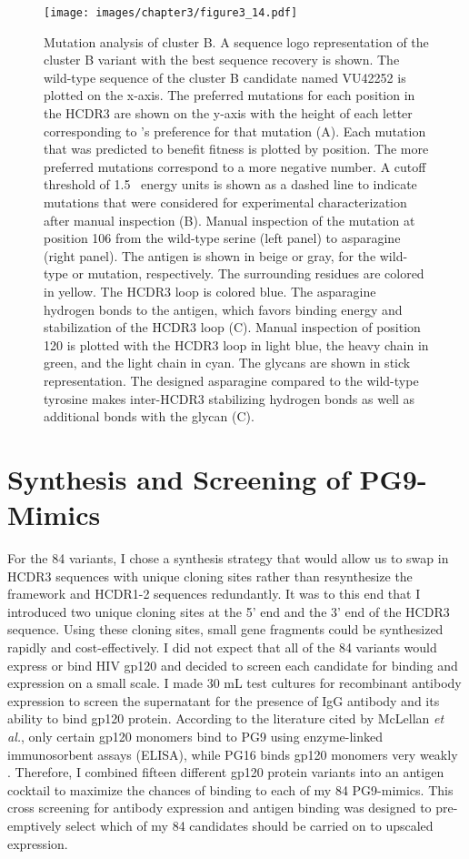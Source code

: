 \begin{figure}
   \centering
   \texttt{[image: images/chapter3/figure3\_14.pdf]} %
   \caption[Mutation Analysis of Cluster B]{Mutation analysis of cluster B. A sequence logo representation of the cluster B variant with the best sequence recovery is shown. The wild-type sequence of the cluster B candidate named VU42252 is plotted on the x-axis. The preferred mutations for each position in the HCDR3 are shown on the y-axis with the height of each letter corresponding to \rosetta's preference for that mutation (A). Each mutation that was predicted to benefit fitness is plotted by position. The more preferred mutations correspond to a more negative number. A cutoff threshold of 1.5 \rosetta~energy units is shown as a dashed line to indicate mutations that were considered for experimental characterization after manual inspection (B). Manual inspection of the mutation at position 106 from the wild-type serine (left panel) to asparagine (right panel). The antigen is shown in beige or gray, for the wild-type or mutation, respectively. The surrounding residues are colored in yellow. The HCDR3 loop is colored blue. The asparagine hydrogen bonds to the antigen, which favors binding energy and stabilization of the HCDR3 loop (C). Manual inspection of position 120 is plotted with the HCDR3 loop in light blue, the heavy chain in green, and the light chain in cyan. The glycans are shown in stick representation. The designed asparagine compared to the wild-type tyrosine makes inter-HCDR3 stabilizing hydrogen bonds as well as additional bonds with the glycan (C).}
   \label{fig:figure3_14}
\end{figure}

\section{Synthesis and Screening of PG9-Mimics}
For the 84 variants, I chose a synthesis strategy that would allow us to swap in HCDR3 sequences with unique cloning sites rather than resynthesize the framework and HCDR1-2 sequences redundantly. It was to this end that I introduced two unique cloning sites at the 5' end and the 3' end of the HCDR3 sequence. Using these cloning sites, small gene fragments could be synthesized rapidly and cost-effectively.  I did not expect that all of the 84 variants would express or bind HIV gp120 and decided to screen each candidate for binding and expression on a small scale.  I made 30 mL test cultures for recombinant antibody expression to screen the supernatant for the presence of IgG antibody and its ability to bind gp120 protein. According to the literature cited by McLellan \textit{et al.}, only certain gp120 monomers bind to PG9 using enzyme-linked immunosorbent assays (ELISA), while PG16 binds gp120 monomers very weakly  \citep{McLellan:2011dg}. Therefore, I combined fifteen different gp120 protein variants into an antigen cocktail to maximize the chances of binding to each of my 84 PG9-mimics. This cross screening for antibody expression and antigen binding was designed to pre-emptively select which of my 84 candidates should be carried on to upscaled expression.

